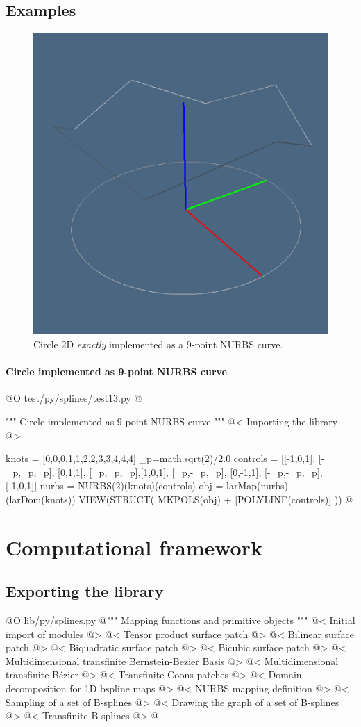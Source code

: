 \documentclass[11pt,oneside]{article}	%
\begin{document}
\subsection{Examples}


\begin{figure}[htbp] %
   \centering
   \includegraphics[width=0.33\linewidth]{images/nurbs-circle} 
   \caption{Circle 2D \emph{exactly} implemented as a 9-point NURBS curve.}
   \label{fig:example}
\end{figure}


\paragraph{Circle implemented as 9-point NURBS curve}

@O test/py/splines/test13.py
@{""" Circle implemented as 9-point NURBS curve """
@< Importing the library @>

knots = [0,0,0,1,1,2,2,3,3,4,4,4]
_p=math.sqrt(2)/2.0
controls = [[-1,0,1], [-_p,_p,_p], [0,1,1], [_p,_p,_p],[1,0,1], [_p,-_p,_p], 
			[0,-1,1], [-_p,-_p,_p], [-1,0,1]]
nurbs = NURBS(2)(knots)(controls)
obj = larMap(nurbs)(larDom(knots))
VIEW(STRUCT( MKPOLS(obj) + [POLYLINE(controls)] ))
@}



\section{Computational framework}
\subsection{Exporting the library}
@O lib/py/splines.py
@{""" Mapping functions and primitive objects """
@< Initial import of modules @>
@< Tensor product surface patch @>
@< Bilinear surface patch @>
@< Biquadratic surface patch @>
@< Bicubic surface patch @>
@< Multidimensional transfinite Bernstein-Bezier Basis @>
@< Multidimensional transfinite B\'ezier @>
@< Transfinite Coons patches @>
@< Domain decomposition for 1D bspline maps @>
@< NURBS mapping definition @>
@< Sampling of a set of B-splines @>
@< Drawing the graph of a set of B-splines @>
@< Transfinite B-splines @>
@}
\end{document}
